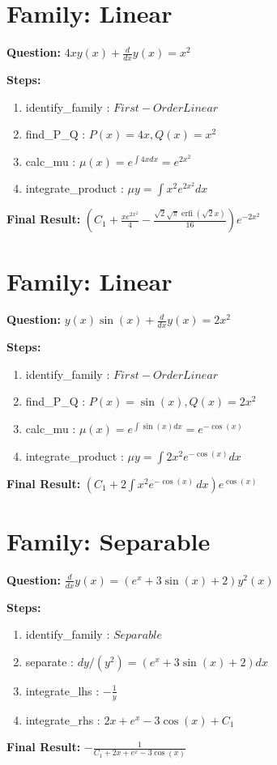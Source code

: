 \documentclass{article}
\begin{document}
\section*{Family: Linear}
\textbf{Question:} $4 x y{\left(x \right)} + \frac{d}{d x} y{\left(x \right)} = x^{2}$

\textbf{Steps:}
\begin{enumerate}
\item identify_family :  $First-Order Linear$
\item find_P_Q :  $P(x)=4 x, Q(x)=x^{2}$
\item calc_mu :  $\mu(x) = e^{\int 4 x dx} = e^{2 x^{2}}$
\item integrate_product :  $\mu y = \int x^{2} e^{2 x^{2}} dx$
\end{enumerate}
\textbf{Final Result:} $\left(C_{1} + \frac{x e^{2 x^{2}}}{4} - \frac{\sqrt{2} \sqrt{\pi} \operatorname{erfi}{\left(\sqrt{2} x \right)}}{16}\right) e^{- 2 x^{2}}$

\section*{Family: Linear}
\textbf{Question:} $y{\left(x \right)} \sin{\left(x \right)} + \frac{d}{d x} y{\left(x \right)} = 2 x^{2}$

\textbf{Steps:}
\begin{enumerate}
\item identify_family :  $First-Order Linear$
\item find_P_Q :  $P(x)=\sin{\left(x \right)}, Q(x)=2 x^{2}$
\item calc_mu :  $\mu(x) = e^{\int \sin{\left(x \right)} dx} = e^{- \cos{\left(x \right)}}$
\item integrate_product :  $\mu y = \int 2 x^{2} e^{- \cos{\left(x \right)}} dx$
\end{enumerate}
\textbf{Final Result:} $\left(C_{1} + 2 \int x^{2} e^{- \cos{\left(x \right)}}\, dx\right) e^{\cos{\left(x \right)}}$

\section*{Family: Separable}
\textbf{Question:} $\frac{d}{d x} y{\left(x \right)} = \left(e^{x} + 3 \sin{\left(x \right)} + 2\right) y^{2}{\left(x \right)}$

\textbf{Steps:}
\begin{enumerate}
\item identify_family :  $Separable$
\item separate :  $dy / (y^{2}) = (e^{x} + 3 \sin{\left(x \right)} + 2) dx$
\item integrate_lhs :  $- \frac{1}{y}$
\item integrate_rhs :  $2 x + e^{x} - 3 \cos{\left(x \right)} + C_1$
\end{enumerate}
\textbf{Final Result:} $- \frac{1}{C_{1} + 2 x + e^{x} - 3 \cos{\left(x \right)}}$
\end{document}
